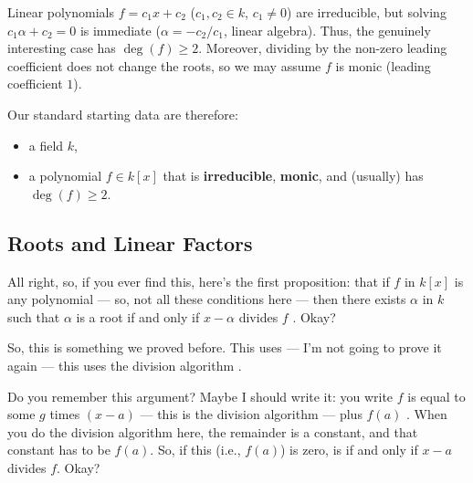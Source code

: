 \begin{content}
Linear polynomials $f = c_1 x + c_2$ ($c_1, c_2 \in k$, $c_1 \neq 0$) are irreducible, but solving $c_1 \alpha + c_2 = 0$ is immediate ($\alpha = -c_2 / c_1$, linear algebra). Thus, the genuinely interesting case has $\deg(f) \ge 2$. Moreover, dividing by the non-zero leading coefficient does not change the roots, so we may assume $f$ is monic (leading coefficient $1$).

Our standard starting data are therefore:
\begin{itemize}
    \item a field $k$,
    \item a polynomial $f \in k[x]$ that is \textbf{irreducible}, \textbf{monic}, and (usually) has $\deg(f) \ge 2$.
\end{itemize}
\end{content}

\subsection{Roots and Linear Factors}

\begin{speech}[00:55:12 - 00:56:32]
All right, so, if you ever find this, here's the first proposition: that if $f$ in $k[x]$ is any polynomial --- so, not all these conditions here --- then there exists $\alpha$ in $k$ such that $\alpha$ is a root if and only if $x - \alpha$ divides $f$ . Okay?

So, this is something we proved before. This uses --- I'm not going to prove it again --- this uses the division algorithm .

Do you remember this argument? Maybe I should write it: you write $f$ is equal to some $g$ times $(x - a)$ --- this is the division algorithm --- plus $f(a)$ . When you do the division algorithm here, the remainder is a constant, and that constant has to be $f(a)$. So, if this (i.e., $f(a)$) is zero, is if and only if $x - a$ divides $f$. Okay?
\end{speech}

